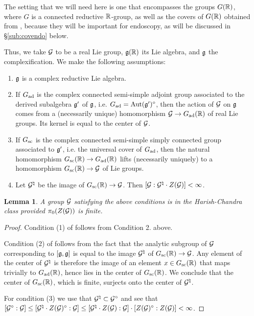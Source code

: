\documentclass{article}
\newtheorem{lem}[thm]{Lemma}
\theoremstyle{definition}
\numberwithin{equation}{section}
\renewcommand{\-}{\hyp{}}
\begin{document}
The setting that we will need here is one that encompasses the groups $G(\mathbb{R})$, where $G$ is a connected reductive $\mathbb{R}$-group, as well as the covers of $G(\mathbb{R})$ obtained from \cite{KalHDC}, because they will be important for endoscopy, as will be discussed in \S\ref{sub:covendo} below.

Thus, we take $\mathcal{G}$ to be a real Lie group, $\mathfrak{g}(\mathbb{R})$ its Lie algebra, and $\mathfrak{g}$ the complexification. We make the following assumptions:
\begin{enumerate}
	\item $\mathfrak{g}$ is a complex reductive Lie algebra.
 	\item If $G_{\textrm{ad}}$ is the complex connected semi-simple adjoint group associated to the derived subalgebra $\mathfrak{g}'$ of $\mathfrak{g}$, i.e. $G_{\textrm{ad}}=\textrm{Aut}(\mathfrak{g}')^\circ$, then the action of $\mathcal{G}$ on $\mathfrak{g}$ comes from a (necessarily unique) homomorphism $\mathcal{G} \to G_{\textrm{ad}}(\mathbb{R})$ of real Lie groups. Its kernel is equal to the center of $\mathcal{G}$.
  	\item If $G_{\textrm{sc}}$ is the complex connected semi-simple simply connected group associated to $\mathfrak{g}'$, i.e. the universal cover of $G_{\textrm{ad}}$, then the natural homomorphism $G_{\textrm{sc}}(\mathbb{R}) \to G_{\textrm{ad}}(\mathbb{R})$ lifts (necessarily uniquely) to a homomorphism $G_{\textrm{sc}}(\mathbb{R}) \to \mathcal{G}$ of Lie groups.
   	\item Let $\mathcal{G}^\natural$ be the image of $G_{\textrm{sc}}(\mathbb{R}) \to \mathcal{G}$. Then $[\mathcal{G}:\mathcal{G}^\natural \cdot Z(\mathcal{G})] < \infty$.
\end{enumerate}

\begin{lem} A group $\mathcal{G}$ satisfying the above conditions is in the Harish-Chandra class provided $\pi_0(Z(\mathcal{G}))$ is finite.
\end{lem}
\begin{proof}
	Condition (1) of \cite[\S3]{HC-R1} follows from Condition 2. above.
	
	Condition (2) of \cite[\S3]{HC-R1} follows from the fact that the analytic subgroup of $\mathcal{G}$ corresponding to $[\mathfrak{g},\mathfrak{g}]$ is equal to the image $\mathcal{G}^\natural$ of $G_{\textrm{sc}}(\mathbb{R}) \to \mathcal{G}$. Any element of the center of $\mathcal{G}^\natural$ is therefore the image of an element $x \in G_{\textrm{sc}}(\mathbb{R})$ that maps trivially to $G_{\textrm{ad}}(\mathbb{R})$, hence lies in the center of $G_{\textrm{sc}}(\mathbb{R})$. We conclude that the center of $G_{\textrm{sc}}(\mathbb{R})$, which is finite, surjects onto the center of $\mathcal{G}^\natural$.

	For condition (3) we use that $\mathcal{G}^\natural \subset \mathcal{G}^\circ$ and see that $[\mathcal{G}^\circ : \mathcal{G}] \leq [\mathcal{G}^\natural \cdot Z(\mathcal{G})^\circ : \mathcal{G}] \leq [\mathcal{G}^\natural \cdot Z(\mathcal{G}) : \mathcal{G}] \cdot [Z(\mathcal{G})^\circ:Z(\mathcal{G})] < \infty$.
\end{proof}
\end{document}
